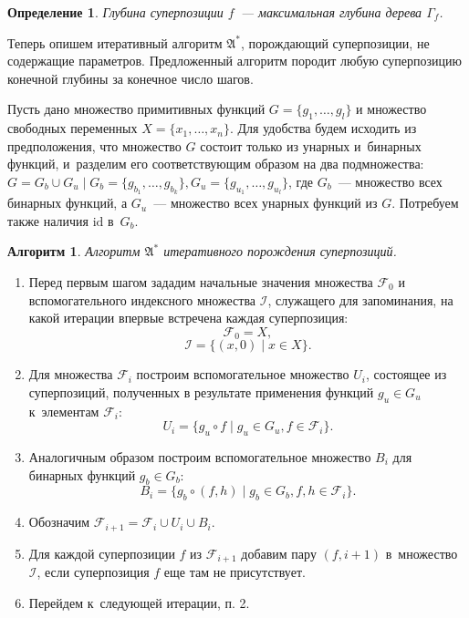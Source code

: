 \documentclass[12pt,a4paper]{article}
\newtheorem{algo}{Алгоритм}
\newtheorem{defin}{Определение}
\begin{document}
\begin{defin}
  Глубина суперпозиции $f$~--- максимальная глубина дерева $\Gamma_f$.
\end{defin}

Теперь опишем итеративный алгоритм $\mathfrak{A^*}$, порождающий суперпозиции,
не содержащие параметров. Предложенный алгоритм породит любую суперпозицию
конечной глубины за конечное число шагов.

Пусть дано множество примитивных функций $G = \{ g_1, \dots, g_l \}$ и
множество свободных переменных $X = \{ x_1, \dots, x_n \}$. Для удобства будем
исходить из предположения, что множество $G$ состоит только из унарных
и~бинарных функций, и~разделим его соответствующим образом на два подмножества:
$G = G_b \cup G_u \mid G_b = \{ g_{b_1}, \dots, g_{b_k} \}, G_u = \{ g_{u_1}, \dots, g_{u_l} \}$,
где $G_b$~--- множество всех бинарных функций, а $G_u$~--- множество всех
унарных функций из $G$. Потребуем также наличия $\text{id}$ в~$G_b$.

\begin{algo}
  Алгоритм $\mathfrak{A^*}$ итеративного порождения суперпозиций.
\end{algo}
\begin{enumerate}
  \item Перед первым шагом зададим начальные значения множества
	$\mathcal{F}_0$ и вспомогательного индексного множества $\mathcal{I}$,
	служащего для запоминания, на какой итерации впервые встречена
	каждая суперпозиция:
	\[
	  \mathcal{F}_0 = X,
	\]
	\[
	  \mathcal{I} = \{ (x, 0) \mid x \in X \}.
	\]
  \item Для множества $\mathcal{F}_i$ построим вспомогательное множество $U_i$,
	состоящее из суперпозиций, полученных в результате применения функций
	$g_u \in G_u$ к~элементам $\mathcal{F}_i$:
	\[
	  U_i = \{ g_u \circ f \mid g_u \in G_u, f \in \mathcal{F}_i \}.
	\]
  \item Аналогичным образом построим вспомогательное множество $B_i$ для
	бинарных функций $g_b \in G_b$:
	\[
	  B_i = \{ g_b \circ (f, h) \mid g_b \in G_b, f, h \in \mathcal{F}_i \}.
	\]
  \item Обозначим $\mathcal{F}_{i+1} = \mathcal{F}_i \cup U_i \cup B_i$.
  \item Для каждой суперпозиции $f$ из $\mathcal{F}_{i+1}$ добавим пару
	$(f, i+1)$ в~множество $\mathcal{I}$, если суперпозиция $f$ еще там
	не присутствует.
  \item Перейдем к~следующей итерации, п. 2. 
\end{enumerate}
\end{document}
